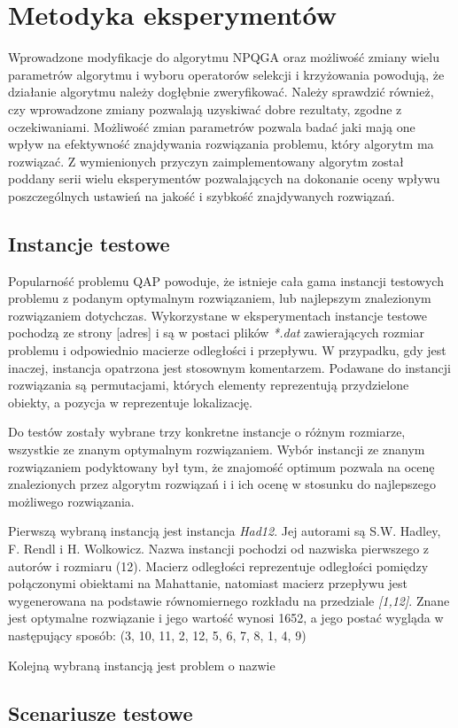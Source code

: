 \chapter{Metodyka eksperymentów}
\label{cha:metodyka}

Wprowadzone modyfikacje do algorytmu NPQGA oraz możliwość zmiany wielu parametrów algorytmu i wyboru operatorów selekcji i krzyżowania powodują, że działanie algorytmu należy dogłębnie zweryfikować. Należy sprawdzić również, czy wprowadzone zmiany pozwalają uzyskiwać dobre rezultaty, zgodne z oczekiwaniami. Możliwość zmian parametrów pozwala badać jaki mają one wpływ na efektywność znajdywania rozwiązania problemu, który algorytm ma rozwiązać. Z wymienionych przyczyn zaimplementowany algorytm został poddany serii wielu eksperymentów pozwalających na dokonanie oceny wpływu poszczególnych ustawień na jakość i szybkość znajdywanych rozwiązań.
 
\section{Instancje testowe}
\label{sec:instancje}
Popularność problemu QAP powoduje, że istnieje cała gama instancji testowych problemu z podanym optymalnym rozwiązaniem, lub najlepszym znalezionym rozwiązaniem dotychczas. Wykorzystane w eksperymentach instancje testowe pochodzą ze strony [adres] i są w postaci plików \textit{*.dat} zawierających rozmiar problemu i odpowiednio macierze odległości i przepływu. W przypadku, gdy jest inaczej, instancja opatrzona jest stosownym komentarzem. Podawane do instancji rozwiązania są permutacjami, których elementy reprezentują przydzielone obiekty, a pozycja w reprezentuje lokalizację.

Do testów zostały wybrane trzy konkretne instancje o różnym rozmiarze, wszystkie ze znanym optymalnym rozwiązaniem. Wybór instancji ze znanym rozwiązaniem podyktowany był tym, że znajomość optimum pozwala na ocenę znalezionych przez algorytm rozwiązań i i ich ocenę w stosunku do najlepszego możliwego rozwiązania.

Pierwszą wybraną instancją jest instancja \textit{Had12}. Jej autorami są S.W. Hadley, F. Rendl i H. Wolkowicz. Nazwa instancji pochodzi od nazwiska pierwszego z autorów i rozmiaru (12). Macierz odległości reprezentuje odległości pomiędzy połączonymi obiektami na Mahattanie, natomiast macierz przepływu jest wygenerowana na podstawie równomiernego rozkładu na przedziale \textit{[1,12]}. Znane jest optymalne rozwiązanie i jego wartość wynosi 1652, a jego postać wygląda w następujący sposób:
\newline
(3, 10, 11, 2, 12, 5, 6, 7, 8, 1, 4, 9)

Kolejną wybraną instancją jest problem o nazwie \textit{}

\section{Scenariusze testowe}
\label{sec:scenariusze}